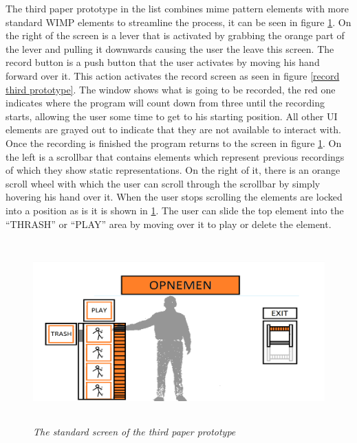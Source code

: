 The third paper prototype in the list combines mime pattern elements with more standard WIMP elements to streamline the process, it can be seen in figure \ref{standard third prototype}. On the right of the screen is a lever that is activated by grabbing the orange part of the lever and pulling it downwards causing the user the leave this screen. The record button is a push button that the user activates by moving his hand forward over it. This action activates the record screen as seen in figure \ref{record third prototype}. The window shows what is going to be recorded, the red one indicates where the program will count down from three until the recording starts, allowing the user some time to get to his starting position. All other UI elements are grayed out to indicate that they are not available to interact with. Once the recording is finished the program returns to the screen in figure \ref{standard third prototype}. On the left is a scrollbar that contains elements which represent previous recordings of which they show static representations. On the right of it, there is an orange scroll wheel with which the user can scroll through the scrollbar by simply hovering his hand over it. When the user stops scrolling the elements are locked into a position as is it is shown in \ref{standard third prototype}. The user can slide the top element into the ``THRASH'' or ``PLAY'' area by moving over it to play or delete the element.\\


\begin{figure}[H]
	\begin{center}
		\includegraphics[width=12.5cm, height=7cm]{figures/prototype_5_3_standard.png}
		\caption{\emph{The standard screen of the third paper prototype}}
		\label{standard third prototype}
	\end{center}
\end{figure}

